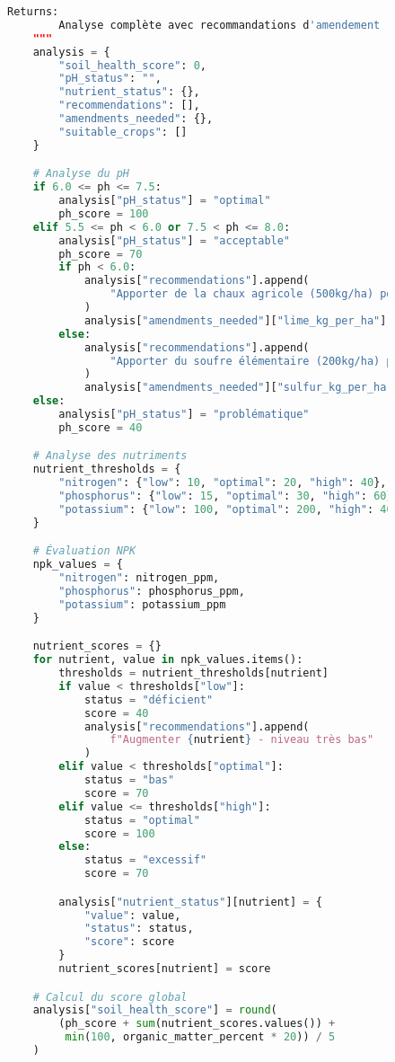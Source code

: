 \begin{figure}[h]
\begin{lstlisting}[language=Python, caption=Implémentation d'outils spécialisés pour l'agriculture]
    Returns:
        Analyse complète avec recommandations d'amendement
    """
    analysis = {
        "soil_health_score": 0,
        "pH_status": "",
        "nutrient_status": {},
        "recommendations": [],
        "amendments_needed": {},
        "suitable_crops": []
    }

    # Analyse du pH
    if 6.0 <= ph <= 7.5:
        analysis["pH_status"] = "optimal"
        ph_score = 100
    elif 5.5 <= ph < 6.0 or 7.5 < ph <= 8.0:
        analysis["pH_status"] = "acceptable"
        ph_score = 70
        if ph < 6.0:
            analysis["recommendations"].append(
                "Apporter de la chaux agricole (500kg/ha) pour augmenter le pH"
            )
            analysis["amendments_needed"]["lime_kg_per_ha"] = 500
        else:
            analysis["recommendations"].append(
                "Apporter du soufre élémentaire (200kg/ha) pour réduire le pH"
            )
            analysis["amendments_needed"]["sulfur_kg_per_ha"] = 200
    else:
        analysis["pH_status"] = "problématique"
        ph_score = 40

    # Analyse des nutriments
    nutrient_thresholds = {
        "nitrogen": {"low": 10, "optimal": 20, "high": 40},
        "phosphorus": {"low": 15, "optimal": 30, "high": 60},
        "potassium": {"low": 100, "optimal": 200, "high": 400}
    }

    # Évaluation NPK
    npk_values = {
        "nitrogen": nitrogen_ppm,
        "phosphorus": phosphorus_ppm,
        "potassium": potassium_ppm
    }

    nutrient_scores = {}
    for nutrient, value in npk_values.items():
        thresholds = nutrient_thresholds[nutrient]
        if value < thresholds["low"]:
            status = "déficient"
            score = 40
            analysis["recommendations"].append(
                f"Augmenter {nutrient} - niveau très bas"
            )
        elif value < thresholds["optimal"]:
            status = "bas"
            score = 70
        elif value <= thresholds["high"]:
            status = "optimal"
            score = 100
        else:
            status = "excessif"
            score = 70

        analysis["nutrient_status"][nutrient] = {
            "value": value,
            "status": status,
            "score": score
        }
        nutrient_scores[nutrient] = score

    # Calcul du score global
    analysis["soil_health_score"] = round(
        (ph_score + sum(nutrient_scores.values()) +
         min(100, organic_matter_percent * 20)) / 5
    )


\end{lstlisting}
\end{figure}
